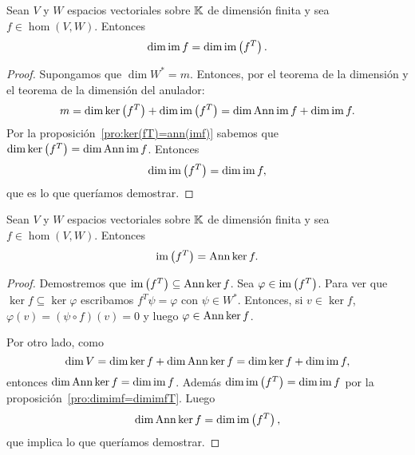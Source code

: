 \begin{prop}
    \label{pro:dimimf=dimimfT}
    Sean $V$ y $W$ espacios vectoriales sobre $\mathbb{K}$ de dimensión finita y sea
    $f\in\hom(V,W)$. Entonces
    \[
        \dim\operatorname{im} f=\dim\operatorname{im}\left(f^T\right).
    \]

    \begin{proof}
        Supongamos que $\dim W^*=m$. Entonces, por el teorema de la dimensión y
        el teorema de la dimensión del anulador:
        \[
            m=\dim\ker\left(f^T\right)+\dim\operatorname{im}\left(f^T\right)
            =\dim\operatorname{Ann}\operatorname{im} f+\dim\operatorname{im} f.
        \]
        Por la proposición~\ref{pro:ker(fT)=ann(imf)} sabemos que
        $\dim\ker\left(f^T\right)=\dim\operatorname{Ann}\operatorname{im} f$. Entonces 
        \[
            \dim\operatorname{im}\left(f^T\right)=\dim\operatorname{im} f,
        \]
        que es lo que queríamos demostrar.
    \end{proof}
\end{prop}

\begin{prop}
    \label{pro:imf^T=annkerf}
    Sean $V$ y $W$ espacios vectoriales sobre $\mathbb{K}$ de dimensión finita y sea
    $f\in\hom(V,W)$. Entonces
    \[
        \operatorname{im}\left(f^T\right)=\operatorname{Ann}\ker f.
    \]

    \begin{proof}
        Demostremos que $\operatorname{im}\left(f^T\right)\subseteq\operatorname{Ann}\ker f$.  Sea
        $\varphi\in\operatorname{im}\left(f^T\right)$. Para ver que $\ker
        f\subseteq\ker\varphi$ escribamos $f^T\psi=\varphi$ con $\psi\in W^*$.
        Entonces, si $v\in\ker f$, $\varphi(v)=(\psi\circ f)(v)=0$ y luego
        $\varphi\in\operatorname{Ann}\ker f$.

        Por otro lado, como
        \[
            \dim V=\dim\ker f+\dim\operatorname{Ann}\ker f=\dim\ker f+\dim\operatorname{im} f,
        \]
        entonces $\dim\operatorname{Ann}\ker f=\dim\operatorname{im} f$. Además 
        $\dim\operatorname{im}\left(f^T\right)=\dim\operatorname{im} f$ por la proposición~\ref{pro:dimimf=dimimfT}. Luego 
        \[
            \dim\operatorname{Ann}\ker f=\dim\operatorname{im}\left(f^T\right),
        \]
        que implica lo que queríamos demostrar.
    \end{proof}
\end{prop}

